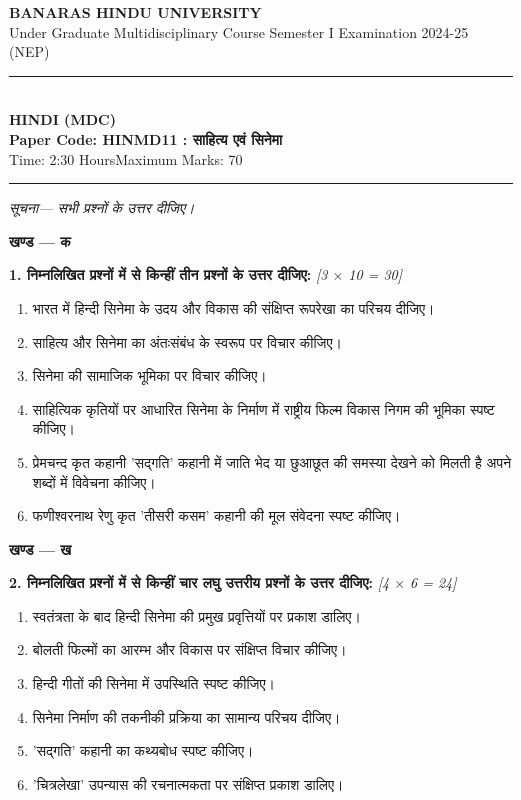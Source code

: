 \documentclass[11pt,a4paper]{article}
\newcommand{\pts}[1]{\hfill \textit{[#1]}}
\begin{document}
\begin{center}
  {\large\bfseries BANARAS HINDU UNIVERSITY}\\[2pt]
  {\normalsize Under Graduate Multidisciplinary Course Semester I Examination 2024-25 (NEP)}\\[6pt]
  \rule{0.8\linewidth}{0.5pt}\\[6pt]
  {\large\bfseries HINDI (MDC)}\\[4pt]
  {\large\bfseries Paper Code: HINMD11 : साहित्य एवं सिनेमा}\\[4pt]
  {\normalsize Time: 2:30 Hours\hfill Maximum Marks: 70}
\end{center}

\rule{\linewidth}{0.4pt}

\smallskip

\noindent \textit{सूचना--- सभी प्रश्नों के उत्तर दीजिए।}

\bigskip

\begin{center}
  \textbf{खण्ड --- क}
\end{center}
\noindent \textbf{1. निम्नलिखित प्रश्नों में से किन्हीं तीन प्रश्नों के उत्तर दीजिए:} \pts{3 $\times$ 10 = 30}
\begin{enumerate}[label=(\क)]
  \item भारत में हिन्दी सिनेमा के उदय और विकास की संक्षिप्त रूपरेखा का परिचय दीजिए।
  \item साहित्य और सिनेमा का अंतःसंबंध के स्वरूप पर विचार कीजिए।
  \item सिनेमा की सामाजिक भूमिका पर विचार कीजिए।
  \item साहित्यिक कृतियों पर आधारित सिनेमा के निर्माण में राष्ट्रीय फिल्म विकास निगम की भूमिका स्पष्ट कीजिए।
  \item प्रेमचन्द कृत कहानी 'सद्गति' कहानी में जाति भेद या छुआछूत की समस्या देखने को मिलती है अपने शब्दों में विवेचना कीजिए।
  \item फणीश्वरनाथ रेणु कृत 'तीसरी कसम' कहानी की मूल संवेदना स्पष्ट कीजिए।
\end{enumerate}

\bigskip

\begin{center}
  \textbf{खण्ड --- ख}
\end{center}
\noindent \textbf{2. निम्नलिखित प्रश्नों में से किन्हीं चार लघु उत्तरीय प्रश्नों के उत्तर दीजिए:} \pts{4 $\times$ 6 = 24}
\begin{enumerate}[label=(\क)]
  \item स्वतंत्रता के बाद हिन्दी सिनेमा की प्रमुख प्रवृत्तियों पर प्रकाश डालिए।
  \item बोलती फिल्मों का आरम्भ और विकास पर संक्षिप्त विचार कीजिए।
  \item हिन्दी गीतों की सिनेमा में उपस्थिति स्पष्ट कीजिए।
  \item सिनेमा निर्माण की तकनीकी प्रक्रिया का सामान्य परिचय दीजिए।
  \item 'सद्गति' कहानी का कथ्यबोध स्पष्ट कीजिए।
  \item 'चित्रलेखा' उपन्यास की रचनात्मकता पर संक्षिप्त प्रकाश डालिए।
\end{enumerate}
\end{document}
